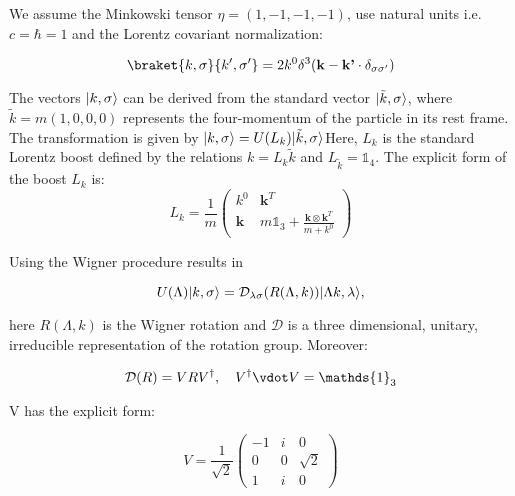 We assume the Minkowski tensor $\eta = (1,-1,-1,-1)$, use natural units i.e. $c = \hbar = 1$ and the Lorentz covariant normalization: 

\begin{equation}
    \braket{k,\sigma}{k',\sigma'} = 2 k^0 \delta^3(\textbf{k} - \textbf{k'} \cdot \delta_{\sigma\sigma'})
\end{equation}

The vectors $\lvert k,\sigma\rangle$ can be derived from the standard vector $\lvert\tilde{k},\sigma\rangle$, where $\tilde{k} = m(1,0,0,0)$ represents the four-momentum of the particle in its rest frame. 
The transformation is given by $\lvert k,\sigma\rangle = U(L_k)\lvert\tilde{k},\sigma\rangle$Here, $L_k$ is the standard Lorentz boost defined by the relations $k = L_k\tilde{k}$ and $L_{\tilde{k}} = \mathds{1}_4$.
The explicit form of the boost $L_k$ is:
\\
\begin{equation}
    L_k = \frac{1}{m}\begin{pmatrix}
        k^0 & \textbf{k}^T \\
        \textbf{k} & m \mathds{1}_3+\frac{\textbf{k}\otimes \textbf{k}^T}{m+k^0} 
        \end{pmatrix}
\end{equation}

Using the Wigner procedure results in

\begin{equation}
    U(\Lambda)\lvert k,\sigma\rangle = \mathcal{D}_{\lambda\sigma}(R(\Lambda,k))\lvert\Lambda k,\lambda\rangle,
\end{equation}

here $R(\Lambda,k)$ is the Wigner rotation and $\mathcal{D}$ is a three dimensional, unitary, irreducible representation of the rotation group.
Moreover:

\begin{equation}
    \mathcal{D}(R) = VRV^\dagger, \quad V^\dagger\vdot V = \mathds{1}_3
\end{equation}

V has the explicit form:

\begin{equation}
    V = \frac{1}{\sqrt{2}}\begin{pmatrix}
        -1 & i & 0 \\
        0 & 0 & \sqrt{2} \\
        1 & i & 0 
        \end{pmatrix}
\end{equation}

